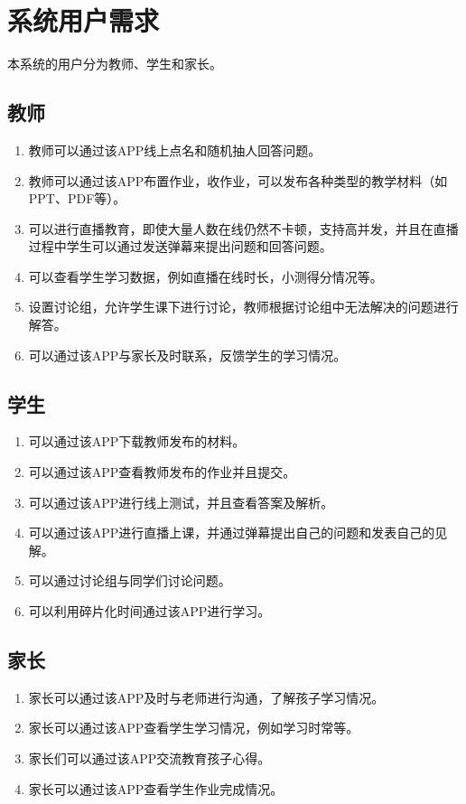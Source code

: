 \section{系统用户需求}
本系统的用户分为教师、学生和家长。
\subsection{教师}
\begin{enumerate}
\item	教师可以通过该APP线上点名和随机抽人回答问题。
\item	教师可以通过该APP布置作业，收作业，可以发布各种类型的教学材料（如PPT、PDF等）。
\item	可以进行直播教育，即使大量人数在线仍然不卡顿，支持高并发，并且在直播过程中学生可以通过发送弹幕来提出问题和回答问题。
\item	可以查看学生学习数据，例如直播在线时长，小测得分情况等。
\item	设置讨论组，允许学生课下进行讨论，教师根据讨论组中无法解决的问题进行解答。
\item	可以通过该APP与家长及时联系，反馈学生的学习情况。
\end{enumerate}

\subsection{学生}
\begin{enumerate}
\item	可以通过该APP下载教师发布的材料。
\item	可以通过该APP查看教师发布的作业并且提交。
\item	可以通过该APP进行线上测试，并且查看答案及解析。
\item	可以通过该APP进行直播上课，并通过弹幕提出自己的问题和发表自己的见解。
\item	可以通过讨论组与同学们讨论问题。
\item	可以利用碎片化时间通过该APP进行学习。
\end{enumerate}

\subsection{家长}
\begin{enumerate}
\item	家长可以通过该APP及时与老师进行沟通，了解孩子学习情况。
\item	家长可以通过该APP查看学生学习情况，例如学习时常等。
\item	家长们可以通过该APP交流教育孩子心得。
\item	家长可以通过该APP查看学生作业完成情况。
\end{enumerate}
